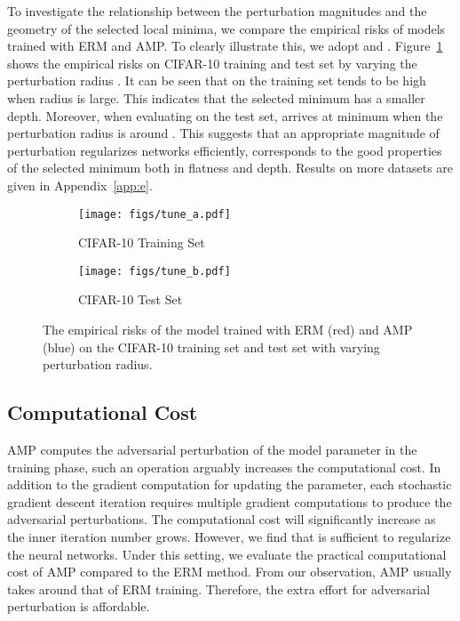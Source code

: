 \documentclass[final]{cvpr}
\begin{document}
To investigate the relationship between the perturbation magnitudes and the geometry of the selected local minima, we compare the empirical risks of models trained with ERM and AMP. To clearly illustrate this, we adopt  and . Figure~\ref{fig:tune} shows the empirical risks on CIFAR-10 training and test set by varying the perturbation radius . It can be seen that  on the training set tends to be high when radius is large. This indicates that the selected minimum has a smaller depth. Moreover, when evaluating on the test set,  arrives at minimum when the perturbation radius is around . This suggests that an appropriate magnitude of perturbation regularizes networks efficiently, corresponds to the good properties of the selected minimum both in flatness and depth. Results on more datasets are given in Appendix~\ref{app:e}.

\begin{figure}[t]
\centering
\begin{subfigure}{0.49\columnwidth}\centering \captionsetup{width=0.88\columnwidth}\texttt{[image: figs/tune\_a.pdf]}\caption{CIFAR-10 Training Set}\end{subfigure}\begin{subfigure}{0.49\columnwidth}\centering \captionsetup{width=0.88\columnwidth}\texttt{[image: figs/tune\_b.pdf]}\caption{CIFAR-10 Test Set}\end{subfigure}\caption{The empirical risks of the model trained with ERM (red) and AMP (blue) on the CIFAR-10 training set and test set with varying perturbation radius.}
\label{fig:tune}
\end{figure}

\subsection{Computational Cost}\label{sec:cost}

AMP computes the adversarial perturbation of the model parameter in the training phase, such an operation arguably increases the computational cost. In addition to the gradient computation for updating the parameter, each stochastic gradient descent iteration requires multiple gradient computations to produce the adversarial perturbations. The computational cost will significantly increase as the inner iteration number  grows. However, we find that  is sufficient to regularize the neural networks. Under this setting, we evaluate the practical computational cost of AMP compared to the ERM method. From our observation, AMP usually takes around  that of ERM training. Therefore, the extra effort for adversarial perturbation is affordable.
\end{document}
